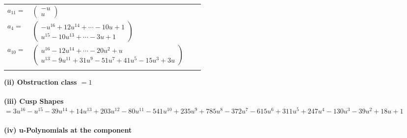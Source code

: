 \documentclass[1p]{elsarticle_modified}
\theoremstyle{definition}
\begin{document}
\begin{tabular}{m{7pt} m{180pt} m{7pt} m{180pt} }
\flushright $a_{11}=$&$\begin{pmatrix}- u\\u\end{pmatrix}$ \\
\flushright $a_{4}=$&$\begin{pmatrix}- u^{16}+12 u^{14}+\cdots-10 u+1\\u^{15}-10 u^{13}+\cdots-3 u+1\end{pmatrix}$ \\
\flushright $a_{10}=$&$\begin{pmatrix}u^{16}-12 u^{14}+\cdots-20 u^2+u\\u^{13}-9 u^{11}+31 u^9-51 u^7+41 u^5-15 u^3+3 u\end{pmatrix}$\\&\end{tabular}
\flushleft \textbf{(ii) Obstruction class $= 1$}\\~\\
\flushleft \textbf{(iii) Cusp Shapes $= 3 u^{16}- u^{15}-39 u^{14}+14 u^{13}+203 u^{12}-80 u^{11}-541 u^{10}+235 u^9+785 u^8-372 u^7-615 u^6+311 u^5+247 u^4-130 u^3-39 u^2+18 u+1$}\\~\\
\newpage\renewcommand{\arraystretch}{1}
\flushleft \textbf{(iv) u-Polynomials at the component}\newline \\
\end{document}

